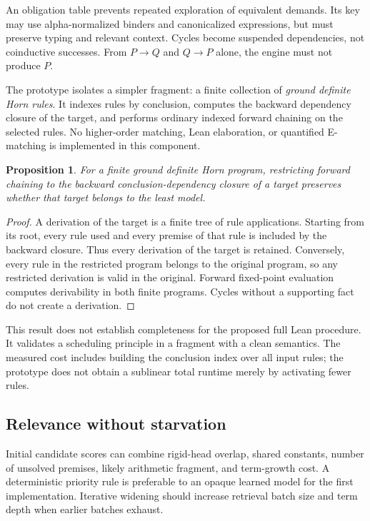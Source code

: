 \documentclass[11pt,a4paper]{article}
\newtheorem{proposition}{Proposition}[section]
\begin{document}
An obligation table prevents repeated exploration of equivalent demands. Its key may use alpha-normalized binders and canonicalized expressions, but must preserve typing and relevant context. Cycles become suspended dependencies, not coinductive successes. From $P\to Q$ and $Q\to P$ alone, the engine must not produce $P$.

The prototype isolates a simpler fragment: a finite collection of \emph{ground definite Horn rules}. It indexes rules by conclusion, computes the backward dependency closure of the target, and performs ordinary indexed forward chaining on the selected rules. No higher-order matching, Lean elaboration, or quantified E-matching is implemented in this component.

\begin{proposition}
For a finite ground definite Horn program, restricting forward chaining to the backward conclusion-dependency closure of a target preserves whether that target belongs to the least model.
\end{proposition}
\begin{proof}
A derivation of the target is a finite tree of rule applications. Starting from its root, every rule used and every premise of that rule is included by the backward closure. Thus every derivation of the target is retained. Conversely, every rule in the restricted program belongs to the original program, so any restricted derivation is valid in the original. Forward fixed-point evaluation computes derivability in both finite programs. Cycles without a supporting fact do not create a derivation.
\end{proof}

This result does not establish completeness for the proposed full Lean procedure. It validates a scheduling principle in a fragment with a clean semantics. The measured cost includes building the conclusion index over all input rules; the prototype does not obtain a sublinear total runtime merely by activating fewer rules.

\subsection{Relevance without starvation}

Initial candidate scores can combine rigid-head overlap, shared constants, number of unsolved premises, likely arithmetic fragment, and term-growth cost. A deterministic priority rule is preferable to an opaque learned model for the first implementation. Iterative widening should increase retrieval batch size and term depth when earlier batches exhaust.
\end{document}
